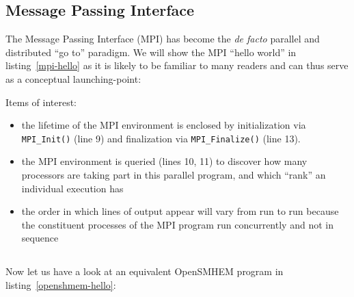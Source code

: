 \begin{minipage}{\linewidth}
\vspace{0.1in}
\vspace{0.1in}
\end{minipage}

\subsection{Message Passing Interface}

The Message Passing Interface (MPI) has become the \textit{de facto}
parallel and distributed ``go to'' paradigm.  We will show the MPI
``hello world'' in listing~\ref{mpi-hello} as it is likely to be
familiar to many readers and can thus serve as a conceptual
launching-point:

\begin{minipage}{\linewidth}
\vspace{0.1in}
\vspace{0.1in}
\end{minipage}

Items of interest:

\begin{itemize}
\item the lifetime of the MPI environment is enclosed by
  initialization via \texttt{MPI\_Init()} (line 9) and finalization
  via \texttt{MPI\_Finalize()} (line 13).
\item the MPI environment is queried (lines 10, 11) to discover how
  many processors are taking part in this parallel program, and which
  ``rank'' an individual execution has
\item the order in which lines of output appear will vary from run to
  run because the constituent processes of the MPI program run
  concurrently and not in sequence
\end{itemize}

\subsection{\openshmem}

Now let us have a look at an equivalent OpenSMHEM program in
listing~\ref{openshmem-hello}:


